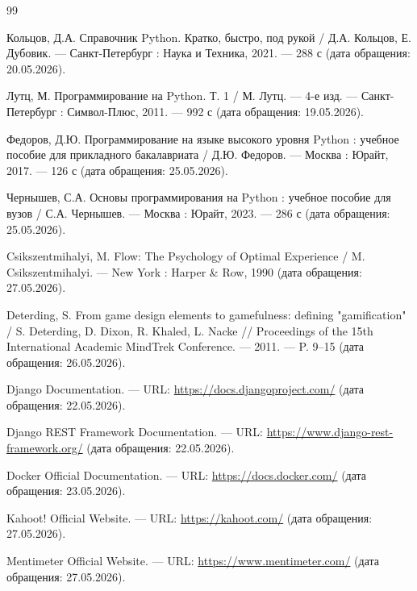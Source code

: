 \documentclass[14pt,a4paper]{extreport}
\begin{document}
\newpage
\centeredrefname
\clearpage
{}
\begin{thebibliography}{99}


 Кольцов, Д.А. Справочник Python. Кратко, быстро, под рукой / Д.А. Кольцов, Е. Дубовик. — Санкт-Петербург : Наука и Техника, 2021. — 288 с (дата обращения: 20.05.2026).

 Лутц, М. Программирование на Python. Т. 1 / М. Лутц. — 4-е изд. — Санкт-Петербург : Символ-Плюс, 2011. — 992 с (дата обращения: 19.05.2026).

 Федоров, Д.Ю. Программирование на языке высокого уровня Python : учебное пособие для прикладного бакалавриата / Д.Ю. Федоров. — Москва : Юрайт, 2017. — 126 с (дата обращения: 25.05.2026).

 Чернышев, С.А. Основы программирования на Python : учебное пособие для вузов / С.А. Чернышев. — Москва : Юрайт, 2023. — 286 с (дата обращения: 25.05.2026).


 Csikszentmihalyi, M. Flow: The Psychology of Optimal Experience / M. Csikszentmihalyi. — New York : Harper \& Row, 1990 (дата обращения: 27.05.2026).

 Deterding, S. From game design elements to gamefulness: defining "gamification" / S. Deterding, D. Dixon, R. Khaled, L. Nacke // Proceedings of the 15th International Academic MindTrek Conference. — 2011. — P. 9–15 (дата обращения: 26.05.2026).

 Django Documentation. — URL: \url{https://docs.djangoproject.com/} (дата обращения: 22.05.2026).

 Django REST Framework Documentation. — URL: \url{https://www.django-rest-framework.org/} (дата обращения: 22.05.2026).

 Docker Official Documentation. — URL: \url{https://docs.docker.com/} (дата обращения: 23.05.2026).

 Kahoot! Official Website. — URL: \url{https://kahoot.com/} (дата обращения: 27.05.2026).

 Mentimeter Official Website. — URL: \url{https://www.mentimeter.com/} (дата обращения: 27.05.2026).


\end{thebibliography}
\end{document}
